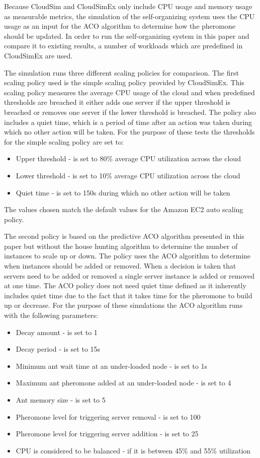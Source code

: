 \documentclass[conference]{IEEEtran}
\begin{document}
Because CloudSim and CloudSimEx only include CPU usage and memory usage as measurable metrics, the simulation of the self-organizing system uses the CPU usage as an input for the ACO algorithm to determine how the pheromone should be updated. In order to run the self-organizing system in this paper and compare it to existing results, a number of workloads which are predefined in CloudSimEx are used.

The simulation runs three different scaling policies for comparison. The first scaling policy used is the simple scaling policy provided by CloudSimEx. This scaling policy measures the average CPU usage of the cloud and when predefined thresholds are breached it either adds one server if the upper threshold is breached or removes one server if the lower threshold is breached. The policy also includes a quiet time, which is a period of time after an action was taken during which no other action will be taken. For the purpose of these tests the thresholds for the simple scaling policy are set to:

\begin{itemize}
	\item Upper threshold - is set to 80\% average CPU utilization across the cloud
	\item Lower threshold - is set to 10\% average CPU utilization across the cloud
	\item Quiet time - is set to 150s during which no other action will be taken
\end{itemize}

The values chosen match the default values for the Amazon EC2 auto scaling policy.

The second policy is based on the predictive ACO algorithm presented in this paper but without the house hunting algorithm to determine the number of instances to scale up or down. The policy uses the ACO algorithm to determine when instances should be added or removed. When a decision is taken that servers need to be added or removed a single server instance is added or removed at one time. The ACO policy does not need quiet time defined as it inherently includes quiet time due to the fact that it takes time for the pheromone to build up or decrease. For the purpose of these simulations the ACO algorithm runs with the following parameters:

\begin{itemize}
	\item Decay amount - is set to 1
	\item Decay period - is set to 15s
	\item Minimum ant wait time at an under-loaded node - is set to 1s
	\item Maximum ant pheromone added at an under-loaded node - is set to 4
	\item Ant memory size - is set to 5
	\item Pheromone level for triggering server removal - is set to 100
	\item Pheromone level for triggering server addition - is set to 25
	\item CPU is considered to be balanced - if it is between 45\% and 55\% utilization
\end{itemize}
\end{document}
